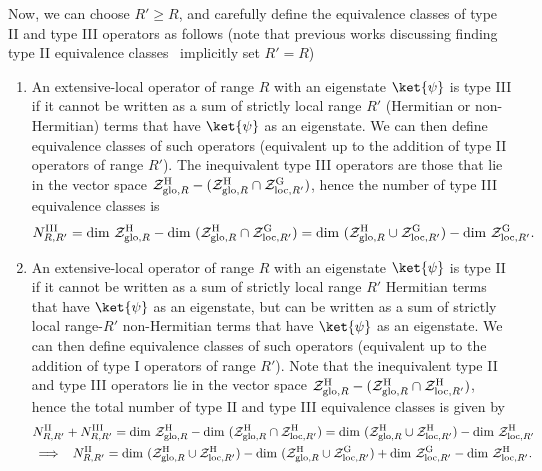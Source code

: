 \documentclass[prx,letterpaper,aps,superscriptaddress,floatfix,twocolumn,nofootinbib]{revtex4-2}
\theoremstyle{definition}
\newcommand{\nn}{\nonumber}
\newcommand{\mZ}{\mathcal{Z}}
\begin{document}
%
Now, we can choose $R' \geq R$, and carefully define the equivalence classes of type II and type III operators as follows (note that previous works discussing finding type II equivalence classes~\cite{moudgalya2023exhaustive, moudgalya2023numerical} implicitly set $R' = R$)
\begin{enumerate}
%
    \item An extensive-local operator of range $R$ with an eigenstate $\ket{\psi}$ is type III if it cannot be written as a sum of strictly local range $R'$ (Hermitian or non-Hermitian) terms that have $\ket{\psi}$ as an eigenstate. We can then define equivalence classes of such operators (equivalent up to the addition of type II operators of range $R'$).
    The inequivalent type III operators are those that lie in the vector space $\mZ^{\rm H}_{{\rm glo}, R} - (\mZ^{\rm H}_{{\rm glo}, R} \cap \mZ^{\rm G}_{{\rm loc}, R'})$, hence the number of type III equivalence classes is 
    \begin{equation}
        N^{\rm III}_{R, R'} = \text{dim}\ \mZ^{\rm H}_{{\rm glo}, R} - \text{dim}\ (\mZ^{\rm H}_{{\rm glo}, R} \cap \mZ^{\rm G}_{{\rm loc}, R'}) = \text{dim}\ (\mZ^{\rm H}_{{\rm glo}, R} \cup \mZ^{\rm G}_{{\rm loc}, R'}) - \text{dim}\ \mZ^{\rm G}_{{\rm loc}, R'}.
    \end{equation}
    \item An extensive-local operator of range $R$ with an eigenstate $\ket{\psi}$ is type II if it cannot be written as a sum of strictly local range $R'$ Hermitian terms that have $\ket{\psi}$ as an eigenstate, but can be written as a sum of strictly local range-$R'$ non-Hermitian terms that have $\ket{\psi}$ as an eigenstate. 
    We can then define equivalence classes of such operators (equivalent up to the addition of type I operators of range $R'$).
    Note that the inequivalent type II and type III operators lie in the vector space $\mZ^{\rm H}_{{\rm glo}, R} - (\mZ^{\rm H}_{{\rm glo}, R} \cap \mZ^{\rm H}_{{\rm loc}, R'})$, hence the total number of type II and type III equivalence classes is given by
    \begin{gather}
        N^{\rm II}_{R, R'} + N^{\rm III}_{R, R'}  = \text{dim}\ \mZ^{\rm H}_{{\rm glo}, R} - \text{dim}\ (\mZ^{\rm H}_{{\rm glo}, R} \cap \mZ^{\rm H}_{{\rm loc}, R'}) = \text{dim}\ (\mZ^{\rm H}_{{\rm glo}, R} \cup \mZ^{\rm H}_{{\rm loc}, {R'}}) - \text{dim}\ \mZ^{\rm H}_{{\rm loc}, R'}\nn \\
        \implies\;\;N^{\rm II}_{R,R'} = \text{dim}\ (\mZ^{\rm H}_{{\rm glo}, R} \cup \mZ^{\rm H}_{{\rm loc}, {R'}}) - \text{dim}\ (\mZ^{\rm H}_{{\rm glo}, R} \cup \mZ^{\rm G}_{{\rm loc}, R'}) + \text{dim}\ \mZ^{\rm G}_{{\rm loc}, R'} - \text{dim}\ \mZ^{\rm H}_{{\rm loc}, R'}.
    \end{gather} 
\end{enumerate}
\end{document}
